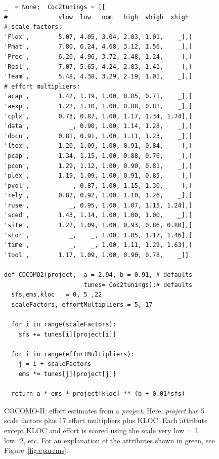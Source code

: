 \documentclass[smallcondesed]{svjour3}
\newcommand{\fig}[1]{Figure~\ref{fig:#1}}
\begin{document}
\begin{figure}[!t]
\begin{lstlisting}
_  = None;  Coc2tunings = [[
#              vlow  low   nom   high  vhigh  xhigh   
# scale factors:
'Flex',        5.07, 4.05, 3.04, 2.03, 1.01,    _],[
'Pmat',        7.80, 6.24, 4.68, 3.12, 1.56,    _],[
'Prec',        6.20, 4.96, 3.72, 2.48, 1.24,    _],[
'Resl',        7.07, 5.65, 4.24, 2.83, 1.41,    _],[
'Team',        5.48, 4.38, 3.29, 2.19, 1.01,    _],[
# effort multipliers:        
'acap',        1.42, 1.19, 1.00, 0.85, 0.71,    _],[
'aexp',        1.22, 1.10, 1.00, 0.88, 0.81,    _],[
'cplx',        0.73, 0.87, 1.00, 1.17, 1.34, 1.74],[
'data',           _, 0.90, 1.00, 1.14, 1.28,    _],[
'docu',        0.81, 0.91, 1.00, 1.11, 1.23,    _],[
'ltex',        1.20, 1.09, 1.00, 0.91, 0.84,    _],[
'pcap',        1.34, 1.15, 1.00, 0.88, 0.76,    _],[ 
'pcon',        1.29, 1.12, 1.00, 0.90, 0.81,    _],[
'plex',        1.19, 1.09, 1.00, 0.91, 0.85,    _],[ 
'pvol',           _, 0.87, 1.00, 1.15, 1.30,    _],[
'rely',        0.82, 0.92, 1.00, 1.10, 1.26,    _],[
'ruse',           _, 0.95, 1.00, 1.07, 1.15, 1.24],[
'sced',        1.43, 1.14, 1.00, 1.00, 1.00,    _],[ 
'site',        1.22, 1.09, 1.00, 0.93, 0.86, 0.80],[ 
'stor',           _,    _, 1.00, 1.05, 1.17, 1.46],[
'time',           _,    _, 1.00, 1.11, 1.29, 1.63],[
'tool',        1.17, 1.09, 1.00, 0.90, 0.78,    _]]

def COCOMO2(project,  a = 2.94, b = 0.91, # defaults
                      tunes= Coc2tunings):# defaults 
  sfs,ems,kloc   = 0, 5 ,22        
  scaleFactors, effortMultipliers = 5, 17
  
  for i in range(scaleFactors):
    sfs += tunes[i][project[i]]
    
  for i in range(effortMultipliers):
    j = i + scaleFactors
    ems *= tunes[j][project[j]] 
    
  return a * ems * project[kloc] ** (b + 0.01*sfs) 
\end{lstlisting}
\caption{COCOMO-II: effort estimates from a {\em project}.
Here, {\em project} has  5 scale
factors plus 17 effort multipliers plus KLOC. 
Each attribute except KLOC and effort is scored
using the scale very low = 1, low=2, etc.
For an explanation of the attributes shown in
green, see \fig{cparems}.}\label{fig:coc2}
\end{figure}

\end{document}
